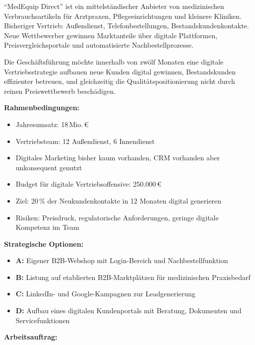 \documentclass[11pt,a4paper,oneside]{article}
\begin{document}
\begin{infobox}
``MedEquip Direct'' ist ein mittelständischer Anbieter von medizinischen Verbrauchsartikeln für Arztpraxen, Pflegeeinrichtungen und kleinere Kliniken. Bisheriger Vertrieb: Außendienst, Telefonbestellungen, Bestandskundenkontakte. Neue Wettbewerber gewinnen Marktanteile über digitale Plattformen, Preisvergleichsportale und automatisierte Nachbestellprozesse.

\smallskip
Die Geschäftsführung möchte innerhalb von zwölf Monaten eine digitale Vertriebsstrategie aufbauen \textendash{} neue Kunden digital gewinnen, Bestandskunden effizienter betreuen, und gleichzeitig die Qualitätspositionierung nicht durch reinen Preiswettbewerb beschädigen.

\smallskip
\textbf{Rahmenbedingungen:}
\begin{itemize}
  \item Jahresumsatz: 18\,Mio.\,\euro
  \item Vertriebsteam: 12 Außendienst, 6 Innendienst
  \item Digitales Marketing bisher kaum vorhanden, CRM vorhanden aber unkonsequent genutzt
  \item Budget für digitale Vertriebsoffensive: 250.000\,\euro
  \item Ziel: 20\,\% der Neukundenkontakte in 12 Monaten digital generieren
  \item Risiken: Preisdruck, regulatorische Anforderungen, geringe digitale Kompetenz im Team
\end{itemize}

\smallskip
\textbf{Strategische Optionen:}
\begin{itemize}
  \item \textbf{A:} Eigener B2B-Webshop mit Login-Bereich und Nachbestellfunktion
  \item \textbf{B:} Listung auf etablierten B2B-Marktplätzen für medizinischen Praxisbedarf
  \item \textbf{C:} LinkedIn- und Google-Kampagnen zur Leadgenerierung
  \item \textbf{D:} Aufbau eines digitalen Kundenportals mit Beratung, Dokumenten und Servicefunktionen
\end{itemize}
\end{infobox}

\noindent\textbf{Arbeitsauftrag:}
\end{document}
